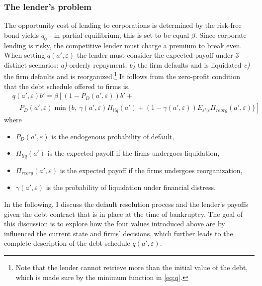 \documentclass[12pt]{article}
\begin{document}
\subsubsection{The lender's problem}    \label{sec: The lender's problem}
The opportunity cost of lending to corporations is determined by the risk-free bond yields $q_0$ - in partial equilibrium, this is set to be equal $\beta$. Since corporate lending is risky, the competitive lender must charge a premium to break even. When setting $q(a',\varepsilon)$ the lender must consider the expected payoff under 3 distinct scenarios: \textit{a)} orderly repayment; \textit{b)} the firm defaults and is liquidated \textit{c)} the firm defaults and is reorganized.\footnote{Note that the lender cannot retrieve more than the initial value of the debt, which is made sure by the minimum function in \ref{eq:q}.}  It follows from the zero-profit condition that the debt schedule offered to firms is, 
\begin{equation} \label{eq:q}
    \begin{split}
        & q(a', \varepsilon)b' =  \beta \left[ (1-P_D(a', \varepsilon))b' + \right. \\
        & \quad P_D(a', \varepsilon) \min \{b, \ \gamma(a', \varepsilon) \Pi_{liq}(a') +  \left. (1-\gamma(a', \varepsilon)) E_{\varepsilon'|\varepsilon} \Pi_{reorg}(a', \varepsilon) \} \right] 
    \end{split}
 \end{equation}
where 
\begin{itemize}\setlength\itemsep{0em} 
    \item $P_D(a', \varepsilon)$ is the endogenous probability of default,
    \item $\Pi_{liq}(a')$ is the expected payoff if the firms undergoes liquidation,
    \item $\Pi_{reorg}(a', \varepsilon)$ is the expected payoff if the firms undergoes reorganization,
    \item $\gamma(a', \varepsilon)$ is the probability of liquidation under financial distress. 
\end{itemize} 
In the following, I discuss the default resolution process and the lender's payoffs given the debt contract that is in place at the time of bankruptcy. The goal of this discussion is to explore how the four values introduced above are by influenced the current state and firms' decisions, which further leads to the complete description of the debt schedule $q(a', \varepsilon)$.
 
\end{document}
